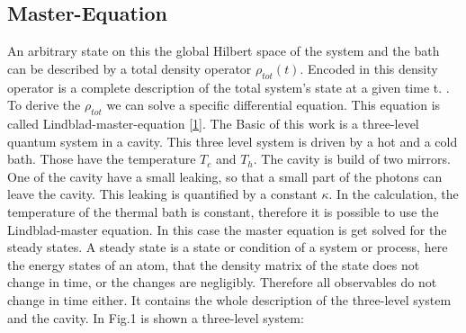 \documentclass[12pt,a4paper]{article}
\begin{document}
\subsection{Master-Equation} 
An arbitrary state on this the global Hilbert space of the system and the bath can be described by a total density operator $\rho_{tot}(t)$. %
Encoded in this density 
operator is a complete description of the total system's state at a given time t. \cite{Li2017}. To derive the $\rho_{tot}$ we can solve a specific differential equation. This equation is called Lindblad-master-equation \eqref{1}. 
The Basic of this work is a three-level quantum system in a cavity. This three level system is driven by a hot and a cold bath. Those have the temperature $T_c$ and $T_h$. The cavity is build of two mirrors. One of the cavity have a small leaking, so that a small part of the photons can leave the cavity. This leaking is quantified by a constant $\kappa$.
In the calculation, the temperature of the thermal bath is constant, therefore 
it is possible to use the Lindblad-master equation. 
In this case the master equation is get solved for the steady states.
A steady state is a state or condition of a system or process, here the energy states of an atom, that the density matrix of the state does not change in time, or the changes are negligibly. Therefore all observables do not change in time either. 
It contains the whole description of the three-level system and the cavity.
In Fig.1 is shown a three-level system:
\newpage
\end{document}
